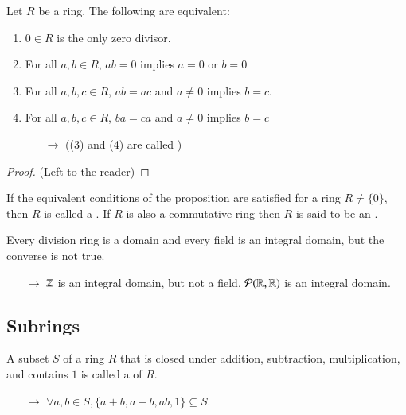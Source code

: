 \begin{proposition}
    Let $R$ be a ring. The following are equivalent:
    \begin{enumerate}
        \item $0\in R$ is the only zero divisor.
        \item For all $a,b \in R$, $ab = 0$ implies $a = 0$ or $b = 0$
        \item For all $a,b,c \in R$, $ab = ac$ and $a \neq 0$ implies $b = c$.
        \item For all $a,b,c \in R$, $ba = ca$ and $a \neq 0$ implies $b = c$
        \begin{enumerate}
            \item[$\rightarrow$] ((3) and (4) are called )
        \end{enumerate}
    \end{enumerate}
    \begin{proof}
        (Left to the reader)
    \end{proof}
\end{proposition}

\begin{definition}
    If the equivalent conditions of the proposition are satisfied for a ring $R \neq \{0\}$, then $R$ is called a . If $R$ is also a commutative ring then $R$ is said to be an .
\end{definition}

\begin{remark}
    Every division ring is a domain and every field is an integral domain, but the converse is not true.
    \begin{enumerate}
        \item[$\rightarrow$] $\mathbb Z$ is an integral domain, but not a field. $\mathcal{P}(\mathbb R,\mathbb R)$ is an integral domain. 
    \end{enumerate}
\end{remark}

\subsection{ Subrings}

\begin{definition}
    A subset $S$ of a ring $R$ that is closed under addition, subtraction, multiplication, and contains $1$ is called a  of $R$.
    \begin{enumerate}
        \item[$\rightarrow$] $\forall a,b \in S, \{a+b,a-b,ab,1\} \subseteq S$.
    \end{enumerate}
\end{definition}

